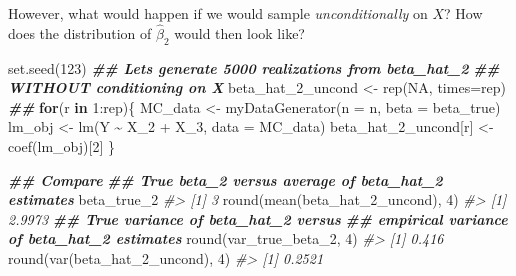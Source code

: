 \documentclass[
  14pt,
]{memoir}
\newenvironment{Shaded}{\begin{snugshade}}{\end{snugshade}}
\newcommand{\AttributeTok}[1]{\textcolor[rgb]{0.77,0.63,0.00}{#1}}
\newcommand{\CommentTok}[1]{\textcolor[rgb]{0.56,0.35,0.01}{\textit{#1}}}
\newcommand{\ConstantTok}[1]{\textcolor[rgb]{0.00,0.00,0.00}{#1}}
\newcommand{\ControlFlowTok}[1]{\textcolor[rgb]{0.13,0.29,0.53}{\textbf{#1}}}
\newcommand{\DecValTok}[1]{\textcolor[rgb]{0.00,0.00,0.81}{#1}}
\newcommand{\DocumentationTok}[1]{\textcolor[rgb]{0.56,0.35,0.01}{\textbf{\textit{#1}}}}
\newcommand{\FunctionTok}[1]{\textcolor[rgb]{0.00,0.00,0.00}{#1}}
\newcommand{\NormalTok}[1]{#1}
\newcommand{\OtherTok}[1]{\textcolor[rgb]{0.56,0.35,0.01}{#1}}
\newcommand{\SpecialCharTok}[1]{\textcolor[rgb]{0.00,0.00,0.00}{#1}}
\begin{document}
However, what would happen if we would sample \emph{unconditionally} on \(X\)? How does the distribution of \(\hat\beta_2\) would then look like?

\begin{Shaded}
\begin{Highlighting}[]
\FunctionTok{set.seed}\NormalTok{(}\DecValTok{123}\NormalTok{)}
\DocumentationTok{\#\# Let\textquotesingle{}s generate 5000 realizations from beta\_hat\_2 }
\DocumentationTok{\#\# WITHOUT conditioning on X}
\NormalTok{beta\_hat\_2\_uncond }\OtherTok{\textless{}{-}} \FunctionTok{rep}\NormalTok{(}\ConstantTok{NA}\NormalTok{, }\AttributeTok{times=}\NormalTok{rep)}
\DocumentationTok{\#\#}
\ControlFlowTok{for}\NormalTok{(r }\ControlFlowTok{in} \DecValTok{1}\SpecialCharTok{:}\NormalTok{rep)\{}
\NormalTok{    MC\_data }\OtherTok{\textless{}{-}} \FunctionTok{myDataGenerator}\NormalTok{(}\AttributeTok{n    =}\NormalTok{ n, }
                               \AttributeTok{beta =}\NormalTok{ beta\_true)}
\NormalTok{    lm\_obj               }\OtherTok{\textless{}{-}} \FunctionTok{lm}\NormalTok{(Y }\SpecialCharTok{\textasciitilde{}}\NormalTok{ X\_2 }\SpecialCharTok{+}\NormalTok{ X\_3, }\AttributeTok{data =}\NormalTok{ MC\_data)}
\NormalTok{    beta\_hat\_2\_uncond[r] }\OtherTok{\textless{}{-}} \FunctionTok{coef}\NormalTok{(lm\_obj)[}\DecValTok{2}\NormalTok{]}
\NormalTok{\}}

\DocumentationTok{\#\# Compare}
\DocumentationTok{\#\# True beta\_2 versus average of beta\_hat\_2 estimates}
\NormalTok{beta\_true\_2}
\CommentTok{\#\textgreater{} [1] 3}
\FunctionTok{round}\NormalTok{(}\FunctionTok{mean}\NormalTok{(beta\_hat\_2\_uncond), }\DecValTok{4}\NormalTok{)}
\CommentTok{\#\textgreater{} [1] 2.9973}
\DocumentationTok{\#\# True variance of beta\_hat\_2 versus }
\DocumentationTok{\#\# empirical variance of beta\_hat\_2 estimates}
\FunctionTok{round}\NormalTok{(var\_true\_beta\_2, }\DecValTok{4}\NormalTok{)}
\CommentTok{\#\textgreater{} [1] 0.416}
\FunctionTok{round}\NormalTok{(}\FunctionTok{var}\NormalTok{(beta\_hat\_2\_uncond), }\DecValTok{4}\NormalTok{)}
\CommentTok{\#\textgreater{} [1] 0.2521}


\end{Highlighting}
\end{Shaded}
\end{document}
